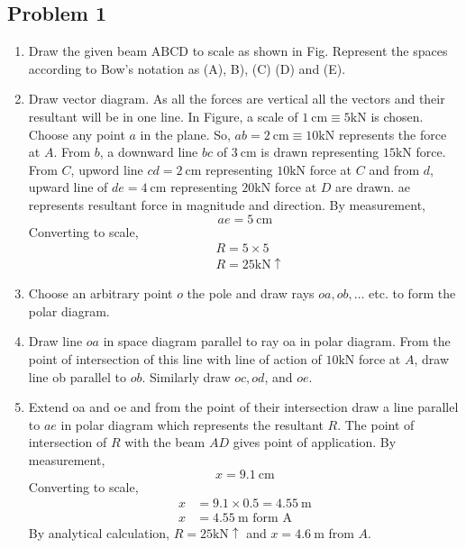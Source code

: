 \documentclass[11pt]{article}
\begin{document}
\subsection{Problem 1}
\begin{enumerate}
	\item Draw the given beam $\mathrm{ABCD}$ to scale as shown in Fig. Represent the spaces according to Bow's notation as (A), B), (C) (D) and (E).
	\item Draw vector diagram. As all the forces are vertical all the vectors and their resultant will be in one line. In Figure, a scale of $1 \mathrm{~cm} \equiv 5 \mathrm{kN}$ is chosen. Choose any point $a$ in the plane. So, $a b=2 \mathrm{~cm} \equiv 10 \mathrm{kN}$ represents the force at $A$. From $b$, a downward line $b c$ of $3 \mathrm{~cm}$ is drawn representing $15 \mathrm{kN}$ force. From $C$, upword line $c d=2 \mathrm{~cm}$ representing $10 \mathrm{kN}$ force at $C$ and from $d$, upward line of $d e=4 \mathrm{~cm}$ representing $20 \mathrm{kN}$ force at $D$ are drawn. ae represents resultant force in magnitude and direction. By measurement,
	$$
	a e=5 \mathrm{~cm}
	$$
	Converting to scale,
	$$
	\begin{aligned}
		&R=5 \times 5 \\
		&R=25 \mathrm{kN} \uparrow
	\end{aligned}
	$$
	\item Choose an arbitrary point $o$ the pole and draw rays $o a, o b, \ldots$ etc. to form the polar diagram.
	\item Draw line $o a$ in space diagram parallel to ray oa in polar diagram. From the point of intersection of this line with line of action of $10 \mathrm{kN}$ force at $A$, draw line ob parallel to $o b$. Similarly draw $o c, o d$, and $o e$.
	\item Extend oa and oe and from the point of their intersection draw a line parallel to $a e$ in polar diagram which represents the resultant $R$. The point of intersection of $R$ with the beam $A D$ gives point of application. By measurement,
	$$
	x=9.1 \mathrm{~cm}
	$$
	Converting to scale,
	$$
	\begin{aligned}
		x &=9.1 \times 0.5=4.55 \mathrm{~m} \\
		x &=4.55 \mathrm{~m} \text { form } \mathrm{A}
	\end{aligned}
	$$
	By analytical calculation, $R=25 \mathrm{kN} \uparrow$ and $x=4.6 \mathrm{~m}$ from $A$.
	
\end{enumerate}
\end{document}
